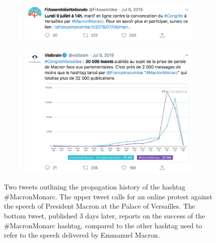 \begin{figure}
    \begin{subfigure}{1\textwidth}
        \includegraphics[width=1\textwidth]{figures/Beatrice/FirstTweetMacronMonarc.png}
        \label{fig:first_tweet_macronmonarc}
    \end{subfigure}
    \begin{subfigure}{1\textwidth}
        \includegraphics[width=1\textwidth]{figures/Beatrice/LastTweetMacronMonarc.png}
        \label{fig:last_tweet_macronmonarc}
    \end{subfigure}
    \caption[Two tweets outlining the propagation history of the hashtag \#MacronMonarc]{Two tweets outlining the propagation history of the hashtag \#MacronMonarc. The upper tweet calls for an online protest against the speech of President Macron at the Palace of Versailles. The bottom tweet, published 3 days later, reports on the success of the \#MacronMonarc hashtag, compared to the other hashtag used to refer to the speech delivered by Emmanuel Macron.}
    \label{fig:macronmonarc}
\end{figure}


